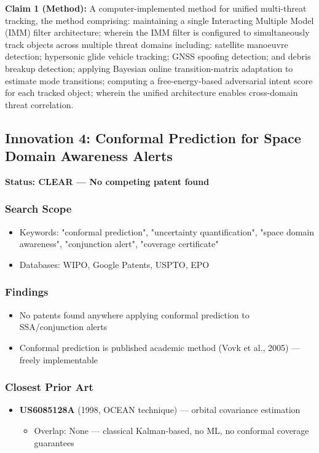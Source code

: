 \documentclass[11pt,a4paper]{article}
\begin{document}
\textbf{Claim 1 (Method):} A computer-implemented method for unified multi-threat tracking, the method comprising: maintaining a single Interacting Multiple Model (IMM) filter architecture; wherein the IMM filter is configured to simultaneously track objects across multiple threat domains including: satellite manoeuvre detection; hypersonic glide vehicle tracking; GNSS spoofing detection; and debris breakup detection; applying Bayesian online transition-matrix adaptation to estimate mode transitions; computing a free-energy-based adversarial intent score for each tracked object; wherein the unified architecture enables cross-domain threat correlation.

\newpage

\subsection{Innovation 4: Conformal Prediction for Space Domain Awareness Alerts}

\textbf{Status: \textcolor{attgreen}{CLEAR — No competing patent found}}

\subsubsection*{Search Scope}
\begin{itemize}
\item Keywords: "conformal prediction", "uncertainty quantification", "space domain awareness", "conjunction alert", "coverage certificate"
\item Databases: WIPO, Google Patents, USPTO, EPO
\end{itemize}

\subsubsection*{Findings}
\begin{itemize}
\item No patents found anywhere applying conformal prediction to SSA/conjunction alerts
\item Conformal prediction is published academic method (Vovk et al., 2005) — freely implementable
\end{itemize}

\subsubsection*{Closest Prior Art}
\begin{itemize}
\item \textbf{US6085128A} (1998, OCEAN technique) — orbital covariance estimation
  \begin{itemize}
  \item Overlap: None — classical Kalman-based, no ML, no conformal coverage guarantees
  \end{itemize}
\end{itemize}
\end{document}
